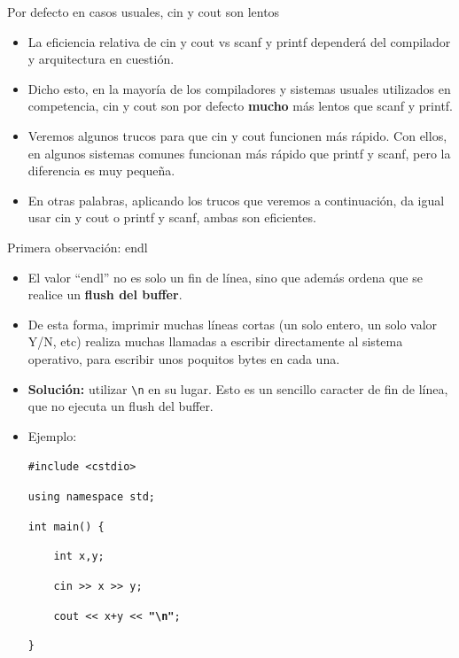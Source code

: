 \documentclass{beamer}
\begin{document}
  \begin{frame}{Por defecto en casos usuales, cin y cout son lentos}
  
    \begin{itemize}
        \item La eficiencia relativa de cin y cout vs scanf y printf dependerá del compilador y arquitectura en cuestión.
        \item Dicho esto, en la mayoría de los compiladores y sistemas usuales utilizados en competencia, cin y cout son por defecto \textbf{mucho} más lentos que scanf y printf.
        \item Veremos algunos trucos para que cin y cout funcionen más rápido. Con ellos, en algunos sistemas comunes funcionan más rápido que printf y scanf, pero la diferencia es muy pequeña.
        \item En otras palabras, aplicando los trucos que veremos a continuación, da igual usar cin y cout o printf y scanf, ambas son eficientes.
    \end{itemize}
    
  \end{frame}
  
  \begin{frame}{Primera observación: endl}
  
    \begin{itemize}
        \item El valor ``endl'' no es solo un fin de línea, sino que además ordena que se realice un \textbf{flush del buffer}.
        \item De esta forma, imprimir muchas líneas cortas (un solo entero, un solo valor Y/N, etc) realiza muchas llamadas a escribir directamente al sistema operativo, para escribir unos poquitos bytes en cada una.
        \item \textbf{Solución:} utilizar \texttt{\textbackslash n} en su lugar. Esto es un sencillo caracter de fin de línea, que no ejecuta un flush del buffer.
        \item Ejemplo:
        
  \texttt{\#include <cstdio>}
  
  \texttt{using namespace std;}
  
  \texttt{int main() \{}
  
  \texttt{    \ \ \ int x,y;}
      
  \texttt{    \ \ \ cin >{}> x >{}> y;}
      
  \texttt{    \ \ \ cout <{}< x+y <{}< \textbf{"\textbackslash n"};}
      
  \texttt{\}}
    \end{itemize}
    
  \end{frame}
  
\end{document}
